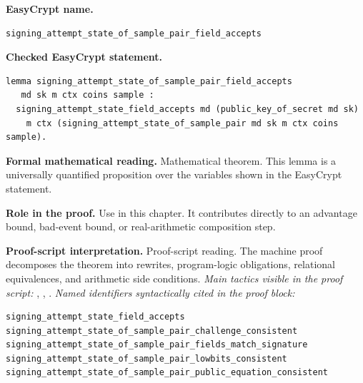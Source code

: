 \begin{formaltheorem}
\noindent\textbf{EasyCrypt name.}
\begin{lstlisting}[language=EasyCrypt,basicstyle=\ttfamily\scriptsize]
signing_attempt_state_of_sample_pair_field_accepts
\end{lstlisting}
\noindent\textbf{Checked EasyCrypt statement.}
\begin{lstlisting}[language=EasyCrypt,basicstyle=\ttfamily\scriptsize]
lemma signing_attempt_state_of_sample_pair_field_accepts
   md sk m ctx coins sample :
  signing_attempt_state_field_accepts md (public_key_of_secret md sk)
    m ctx (signing_attempt_state_of_sample_pair md sk m ctx coins sample).
\end{lstlisting}
\noindent\textbf{Formal mathematical reading.}
Mathematical theorem. This lemma is a universally quantified proposition over the variables shown in the EasyCrypt statement.

\noindent\textbf{Role in the proof.}
Use in this chapter. It contributes directly to an advantage bound, bad-event bound, or real-arithmetic composition step.

\noindent\textbf{Proof-script interpretation.}
Proof-script reading. The machine proof decomposes the theorem into rewrites, program-logic obligations, relational equivalences, and arithmetic side conditions.
\emph{Main tactics visible in the proof script:} , , .
\emph{Named identifiers syntactically cited in the proof block:}
\begin{lstlisting}[language=EasyCrypt,basicstyle=\ttfamily\scriptsize]
signing_attempt_state_field_accepts
signing_attempt_state_of_sample_pair_challenge_consistent
signing_attempt_state_of_sample_pair_fields_match_signature
signing_attempt_state_of_sample_pair_lowbits_consistent
signing_attempt_state_of_sample_pair_public_equation_consistent
\end{lstlisting}

\end{formaltheorem}

